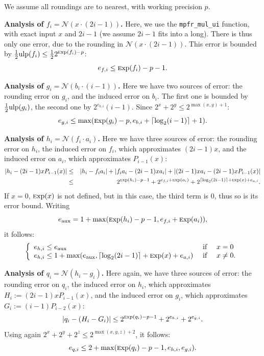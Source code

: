\documentclass[12pt]{amsart}
\def\ulp{{\rm ulp}}
\def\Exp{{\rm \textsc exp}}
\def\N{{\mathcal N}}
\begin{document}
We assume all roundings are to nearest, with working precision $p$.

\par\noindent
\textbf{Analysis of $f_i = \N{}(x\cdot{}(2i - 1))$.} Here, we use the
\texttt{mpfr\_mul\_ui} function, with exact input $x$ and $2i-1$
(we assume $2i-1$ fits into a long).
There is thus only one error, due to the rounding in $\N{}(x\cdot{}(2i - 1))$.
This error is bounded by $\frac{1}{2} \ulp(f_i) \le \frac{1}{2} 2^{\Exp(f_i) - p}$:
\[ e_{f,i} \le \Exp(f_i) - p - 1. \]

\par\noindent
\textbf{Analysis of $g_i = \N{}(b_i \cdot{}(i - 1))$.}
Here we have two sources of error: the rounding error on $g_i$, and
the induced error on $b_i$. The first one is bounded by $\frac{1}{2} \ulp(g_i)$,
the second one by $2^{e_{b,i}} (i-1)$. Since $2^x+2^y \le 2^{\max(x,y)+1}$:
\[ e_{g,i} \le \max(\Exp(g_i)-p, e_{b,i} + \lceil \log_2(i-1) \rceil + 1). \]

\par\noindent
\textbf{Analysis of $h_i = \N{}(f_i\cdot{}a_i)$.}
Here we have three sources of error: the rounding error on $h_i$,
the induced error on $f_i$, which approximates $(2i-1)x$,
and the induced error on $a_i$, which approximates $P_{i-1}(x)$:
\begin{eqnarray*}
  |h_i - (2i-1)x P_{i-1}(x)| & \le &
  |h_i - f_i a_i| + |f_i a_i - (2i-1)x a_i| + |(2i-1)x a_i - (2i-1)x P_{i-1}(x)| \\
  & \le & 2^{\Exp(h_i)-p-1} + 2^{e_{f,i} + \Exp(a_i)} + 2^{\lceil \log_2(2i-1)
                                     \rceil + \Exp(x) + e_{a,i}}.
\end{eqnarray*}
If $x = 0$, $\Exp(x)$ is not defined, but in this case, the third term is $0$,
thus so is its error bound. Writing
\[e_\mathrm{aux} = 1 + \max(\Exp(h_i)-p-1, e_{f,i} + \Exp(a_i)),\]
it follows:
\[\left\{
\begin{array}{lcl}
  e_{h,i} \le e_\mathrm{aux} & \text{ if } & x = 0 \\
  e_{h,i} \le 1 + \max(e_\mathrm{aux},
    \lceil \log_2(2i-1) \rceil + \Exp(x) + e_{a,i}) & \text{ if } & x \ne 0.
\end{array}
\right.\]

\par\noindent
\textbf{Analysis of $q_i = \N{}(h_i - g_i)$.}
Here again, we have three sources of error: the rounding error on $q_i$,
the induced error on $h_i$, which approximates $H_i := (2i-1)x P_{i-1}(x)$,
and the induced error on $g_i$, which approximates $G_i := (i-1)P_{i-2}(x)$:
\[ |q_i - (H_i - G_i)| \le 2^{\Exp(q_i)-p-1} + 2^{e_{h,i}} + 2^{e_{g,i}}. \]
Using again $2^x + 2^y + 2^z \le 2^{\max(x,y,z)+2}$, it follows:
\[ e_{q,i} \le 2 + \max(\Exp(q_i)-p-1, e_{h,i}, e_{g,i}). \]
\end{document}
